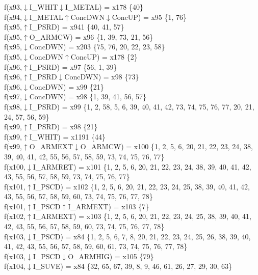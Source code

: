 f(x93,$\downarrow$I\_WHIT$\downarrow$I\_METAL) = x178 \{40\} \\  
f(x94,$\downarrow$I\_METAL$\uparrow$ConcDWN$\downarrow$ConcUP) = x95 \{1, 76\} \\  
f(x95,$\uparrow$I\_PSRD) = x941 \{40, 41, 57\} \\  
f(x95,$\uparrow$O\_ARMCW) = x96 \{1, 39, 73, 21, 56\} \\  
f(x95,$\downarrow$ConcDWN) = x203 \{75, 76, 20, 22, 23, 58\} \\  
f(x95,$\downarrow$ConcDWN$\uparrow$ConcUP) = x178 \{2\} \\  
f(x96,$\uparrow$I\_PSRD) = x97 \{56, 1, 39\} \\  
f(x96,$\uparrow$I\_PSRD$\downarrow$ConcDWN) = x98 \{73\} \\  
f(x96,$\downarrow$ConcDWN) = x99 \{21\} \\  
f(x97,$\downarrow$ConcDWN) = x98 \{1, 39, 41, 56, 57\} \\  
f(x98,$\downarrow$I\_PSRD) = x99 \{1, 2, 58, 5, 6, 39, 40, 41, 42, 73, 74, 75, 76, 77, 20, 21, 24, 57, 56, 59\} \\  
f(x99,$\uparrow$I\_PSRD) = x98 \{21\} \\  
f(x99,$\uparrow$I\_WHIT) = x1191 \{44\} \\  
f(x99,$\uparrow$O\_ARMEXT$\downarrow$O\_ARMCW) = x100 \{1, 2, 5, 6, 20, 21, 22, 23, 24, 38, 39, 40, 41, 42, 55, 56, 57, 58, 59, 73, 74, 75, 76, 77\} \\  
f(x100,$\downarrow$I\_ARMRET) = x101 \{1, 2, 5, 6, 20, 21, 22, 23, 24, 38, 39, 40, 41, 42, 43, 55, 56, 57, 58, 59, 73, 74, 75, 76, 77\} \\  
f(x101,$\uparrow$I\_PSCD) = x102 \{1, 2, 5, 6, 20, 21, 22, 23, 24, 25, 38, 39, 40, 41, 42, 43, 55, 56, 57, 58, 59, 60, 73, 74, 75, 76, 77, 78\} \\  
f(x101,$\uparrow$I\_PSCD$\uparrow$I\_ARMEXT) = x103 \{7\} \\  
f(x102,$\uparrow$I\_ARMEXT) = x103 \{1, 2, 5, 6, 20, 21, 22, 23, 24, 25, 38, 39, 40, 41, 42, 43, 55, 56, 57, 58, 59, 60, 73, 74, 75, 76, 77, 78\} \\  
f(x103,$\downarrow$I\_PSCD) = x84 \{1, 2, 5, 6, 7, 8, 20, 21, 22, 23, 24, 25, 26, 38, 39, 40, 41, 42, 43, 55, 56, 57, 58, 59, 60, 61, 73, 74, 75, 76, 77, 78\} \\  
f(x103,$\downarrow$I\_PSCD$\downarrow$O\_ARMHIG) = x105 \{79\} \\  
f(x104,$\downarrow$I\_SUVE) = x84 \{32, 65, 67, 39, 8, 9, 46, 61, 26, 27, 29, 30, 63\} \\  
